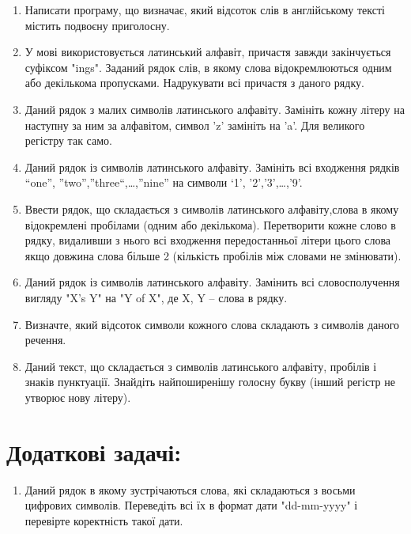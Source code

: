 \documentclass[a5paper,titlepage,openany,twoside,draft]{book_unv}%
\begin{document}
\begin{enumerate}
\item
  Написати програму, що визначає, який відсоток слів в англійському
  тексті містить подвоєну приголосну.
\item
  У мові використовується латинський алфавіт, причастя завжди
  закінчується суфіксом "ings". Заданий рядок слів, в якому слова
  відокремлюються одним або декількома пропусками. Надрукувати всі причастя
  з даного рядку.
\item
  Даний рядок з малих символів латинського алфавіту. Замініть кожну літеру
  на наступну за ним за алфавітом, символ 'z' замініть на 'a'. Для великого
регістру так само.
\item
  Даний рядок із символів латинського алфавіту. Замініть всі входження
  рядків ``one'', ''two'',''three``,\ldots{},''nine'' на символи `1',
  '2','3',\ldots{},'9'.

\item
 Ввести рядок, що складається з символів латинського алфавіту,слова в якому
  відокремлені пробілами (одним або декількома). Перетворити кожне слово в
  рядку, видаливши з нього всі входження передостанньої літери цього 
  слова якщо довжина слова більше 2 (кількість пробілів між словами не змінювати).

\item
Даний рядок із символів латинського алфавіту. Замінить всі словосполучення
вигляду "X's Y" на "Y of X", де X, Y -- слова в рядку.

\item
  Визначте, який відсоток символи кожного слова складають з символів
  даного речення.
\item
  Даний текст, що складається з символів латинського алфавіту, пробілів і
  знаків пунктуації. Знайдіть найпоширенішу голосну букву 
(інший регістр не утворює нову літеру).


\end{enumerate}

\section{Додаткові задачі:}

\begin{enumerate}
\def\labelenumi{\arabic{enumi})}
\setcounter{enumi}{24}
\item
  Даний рядок в якому зустрічаються слова, які складаються з восьми
  цифрових символів. Переведіть всі їх в формат дати "dd-mm-yyyy" і
  перевірте коректність такої дати.
\end{enumerate}
\end{document}
